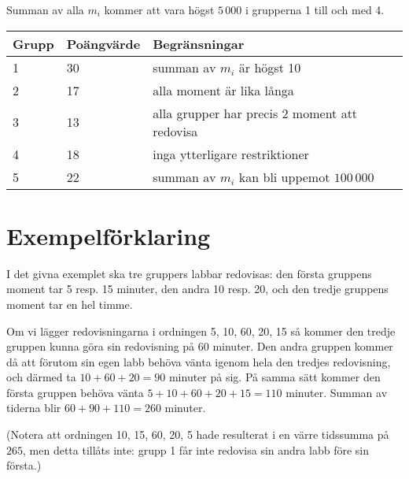 Summan av alla $m_i$ kommer att vara högst $5\,000$ i grupperna 1 till och med 4.

\begin{tabular}{| l | l | l |}
	\hline
	Grupp & Poängvärde & Begränsningar\\ \hline
  1     & 30         & summan av $m_i$ är högst 10 \\ \hline
  2     & 17         & alla moment är lika långa \\ \hline
  3     & 13         & alla grupper har precis 2 moment att redovisa \\ \hline
  4     & 18         & inga ytterligare restriktioner \\ \hline
  5     & 22         & summan av $m_i$ kan bli uppemot $100\,000$ \\ \hline
\end{tabular}

\section*{Exempelförklaring}
I det givna exemplet ska tre gruppers labbar redovisas: den första gruppens moment tar 5 resp. 15 minuter, den andra 10 resp. 20, och den tredje gruppens moment tar en hel timme.

Om vi lägger redovisningarna i ordningen 5, 10, 60, 20, 15 så kommer den tredje gruppen kunna göra sin redovisning på 60 minuter.
Den andra gruppen kommer då att förutom sin egen labb behöva vänta igenom hela den tredjes redovisning, och därmed ta $10+60+20 = 90$ minuter på sig.
På samma sätt kommer den första gruppen behöva vänta $5+10+60+20+15 = 110$ minuter.
Summan av tiderna blir $60 + 90 + 110 = 260$ minuter.

(Notera att ordningen 10, 15, 60, 20, 5 hade resulterat i en värre tidssumma på $265$, men detta tillåts inte: grupp 1 får inte redovisa sin andra labb före sin första.)
